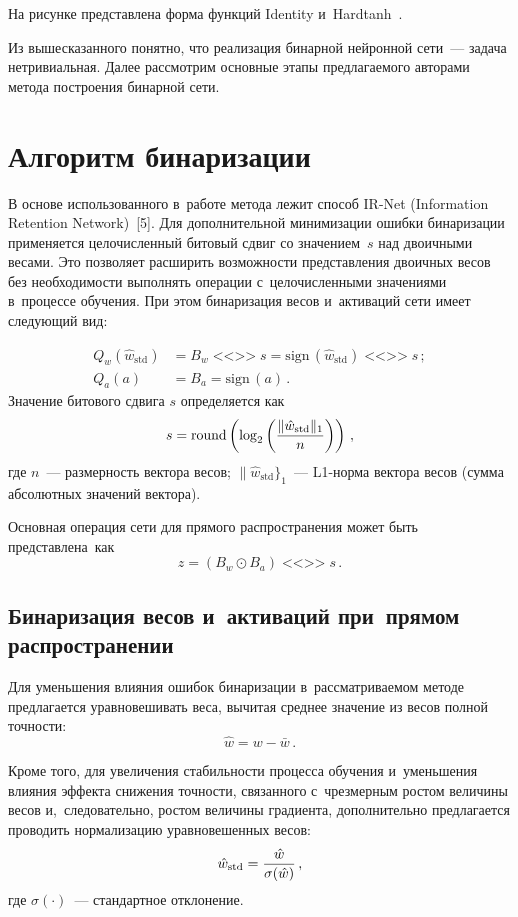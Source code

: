 \begin{multicols}{2}
  На рисунке пред\-став\-ле\-на форма функций Identity и~Hardtanh~\cite{5-mal}.
    
  
  Из вышесказанного понятно, что реализация бинарной нейронной сети~--- 
задача не\-три\-ви\-аль\-ная. Далее рас\-смот\-рим основные этапы пред\-ла\-га\-емо\-го 
авторами метода по\-стро\-ения бинарной \mbox{сети}. 
  
\section{Алгоритм бинаризации}

  В основе использованного в~работе метода лежит способ IR-Net (Information Retention Network)~[5]. Для 
дополнительной минимизации ошиб\-ки бинаризации применяется 
це\-ло\-чис\-лен\-ный битовый сдвиг со значением~$s$ над двоичными весами. Это 
поз\-во\-ля\-ет расширить возможности пред\-став\-ле\-ния двоичных весов без 
не\-об\-хо\-ди\-мости выполнять операции с~це\-ло\-чис\-лен\-ны\-ми значениями в~процессе 
обуче\-ния. При этом бинаризация весов и~активаций сети имеет сле\-ду\-ющий вид:

\noindent
  \begin{align*}
  Q_w(\hat{w}_{\mathrm{std}})&=B_w\;\mbox{<<>>}\;s 
=\mathrm{sign}\,(\hat{w}_{\mathrm{std}})\;\mbox{<<>>}\;s\,;\\
  Q_a(a)&=B_a =\mathrm{sign}\,(a)\,.
  \end{align*}
   Значение битового сдвига $s$ определяется как
  $$
  s=\mathrm{round}\left( \log_2\left( \displaystyle\frac{\displaystyle \| \hat{w}_{\mathrm{std}}\|_1\mathstrut}{\displaystyle n\mathstrut}\right)\right)\,,
  $$
где $n$~--- размерность век\-то\-ра весов; $\|\hat{w}_{\mathrm{std}}\}_1$~--- \mbox{L1-нор}\-ма 
век\-то\-ра весов (сумма абсолютных значений век\-то\-ра).
  
Основная операция сети для прямого рас\-про\-стра\-не\-ния может быть 
пред\-став\-ле\-на~как
  $$
  z=\left( B_w \odot B_a\right)\;\mbox{<<>>}\;s\,.
  $$
  
\subsection{Бинаризация весов и~активаций при~прямом 
распространении}
 
  Для уменьшения влияния ошибок бинаризации в~рас\-смат\-ри\-ва\-емом методе 
предлагается уравновешивать веса, вычитая сред\-нее значение из весов пол\-ной 
точ\-ности:
  $$
  \hat{w}=w-\bar{w}\,.
  $$
  
  Кроме того, для увеличения ста\-биль\-ности процесса обуче\-ния и~уменьшения 
влияния эф\-фек\-та снижения точ\-ности, связанного с~чрезмерным рос\-том 
величины весов и,~следовательно, рос\-том величины градиента, дополнительно 
предлагается проводить нормализацию урав\-но\-ве\-шен\-ных ве\-сов:
  $$
  \hat{w}_{\mathrm{std}} =\displaystyle\frac{\displaystyle \hat{w}\mathstrut}{\displaystyle \sigma(\hat{w})\mathstrut}\,,
  $$
где $\sigma(\cdot)$~--- стандартное от\-кло\-не\-ние. 


\end{multicols}
